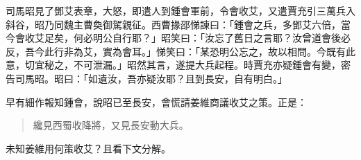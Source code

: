 司馬昭見了鄧艾表章，大怒，即遣人到鍾會軍前，令會收艾，又遣賈充引三萬兵入斜谷，昭乃同魏主曹奐御駕親征。西曹掾邵悌諫曰：「鍾會之兵，多鄧艾六倍，當今會收艾足矣，何必明公自行耶？」昭笑曰：「汝忘了舊日之言耶？汝曾道會後必反，吾今此行非為艾，實為會耳。」悌笑曰：「某恐明公忘之，故以相問。今既有此意，切宜秘之，不可泄漏。」昭然其言，遂提大兵起程。時賈充亦疑鍾會有變，密告司馬昭。昭曰：「如遺汝，吾亦疑汝耶？且到長安，自有明白。」

早有細作報知鍾會，說昭已至長安，會慌請姜維商議收艾之策。正是：

\begin{quote}
纔見西蜀收降將，又見長安動大兵。
\end{quote}

未知姜維用何策收艾？且看下文分解。
